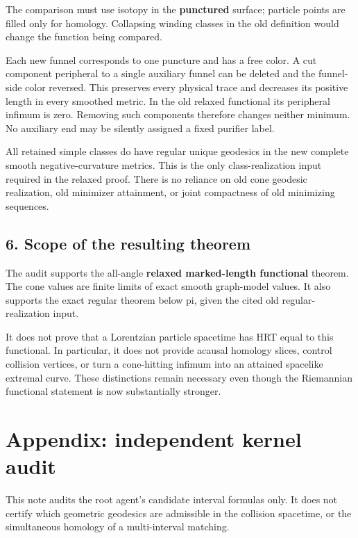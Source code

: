\documentclass[11pt]{article}
\begin{document}
The comparison must use isotopy in the \textbf{punctured} surface;
particle points are filled only for homology. Collapsing winding classes
in the old definition would change the function being compared.

Each new funnel corresponds to one puncture and has a free color. A cut
component peripheral to a single auxiliary funnel can be deleted and the
funnel-side color reversed. This preserves every physical trace and
decreases its positive length in every smoothed metric. In the old
relaxed functional its peripheral infimum is zero. Removing such
components therefore changes neither minimum. No auxiliary end may be
silently assigned a fixed purifier label.

All retained simple classes do have regular unique geodesics in the new
complete smooth negative-curvature metrics. This is the only
class-realization input required in the relaxed proof. There is no
reliance on old cone geodesic realization, old minimizer attainment, or
joint compactness of old minimizing sequences.

\subsection{6. Scope of the resulting
theorem}\label{scope-of-the-resulting-theorem}

The audit supports the all-angle \textbf{relaxed marked-length
functional} theorem. The cone values are finite limits of exact smooth
graph-model values. It also supports the exact regular theorem below pi,
given the cited old regular-realization input.

It does not prove that a Lorentzian particle spacetime has HRT equal to
this functional. In particular, it does not provide acausal homology
slices, control collision vertices, or turn a cone-hitting infimum into
an attained spacelike extremal curve. These distinctions remain
necessary even though the Riemannian functional statement is now
substantially stronger.

\clearpage

\section{Appendix: independent kernel
audit}\label{appendix-independent-kernel-audit}

This note audits the root agent's candidate interval formulas only. It
does not certify which geometric geodesics are admissible in the
collision spacetime, or the simultaneous homology of a multi-interval
matching.
\end{document}
